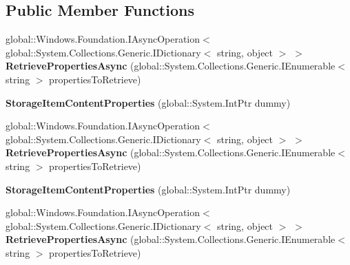 \subsection*{Public Member Functions}
\begin{DoxyCompactItemize}
\item 
\mbox{\label{class_windows_1_1_storage_1_1_file_properties_1_1_storage_item_content_properties_a49d199409f2548b26e524874e512ac0c}} 
global\+::\+Windows.\+Foundation.\+I\+Async\+Operation$<$ global\+::\+System.\+Collections.\+Generic.\+I\+Dictionary$<$ string, object $>$ $>$ {\bfseries Retrieve\+Properties\+Async} (global\+::\+System.\+Collections.\+Generic.\+I\+Enumerable$<$ string $>$ properties\+To\+Retrieve)
\item 
\mbox{\label{class_windows_1_1_storage_1_1_file_properties_1_1_storage_item_content_properties_a0e9bb93cf75c95a12b228b31c6bc3c37}} 
{\bfseries Storage\+Item\+Content\+Properties} (global\+::\+System.\+Int\+Ptr dummy)
\item 
\mbox{\label{class_windows_1_1_storage_1_1_file_properties_1_1_storage_item_content_properties_a49d199409f2548b26e524874e512ac0c}} 
global\+::\+Windows.\+Foundation.\+I\+Async\+Operation$<$ global\+::\+System.\+Collections.\+Generic.\+I\+Dictionary$<$ string, object $>$ $>$ {\bfseries Retrieve\+Properties\+Async} (global\+::\+System.\+Collections.\+Generic.\+I\+Enumerable$<$ string $>$ properties\+To\+Retrieve)
\item 
\mbox{\label{class_windows_1_1_storage_1_1_file_properties_1_1_storage_item_content_properties_a0e9bb93cf75c95a12b228b31c6bc3c37}} 
{\bfseries Storage\+Item\+Content\+Properties} (global\+::\+System.\+Int\+Ptr dummy)
\item 
\mbox{\label{class_windows_1_1_storage_1_1_file_properties_1_1_storage_item_content_properties_a49d199409f2548b26e524874e512ac0c}} 
global\+::\+Windows.\+Foundation.\+I\+Async\+Operation$<$ global\+::\+System.\+Collections.\+Generic.\+I\+Dictionary$<$ string, object $>$ $>$ {\bfseries Retrieve\+Properties\+Async} (global\+::\+System.\+Collections.\+Generic.\+I\+Enumerable$<$ string $>$ properties\+To\+Retrieve)

\end{DoxyCompactItemize}
